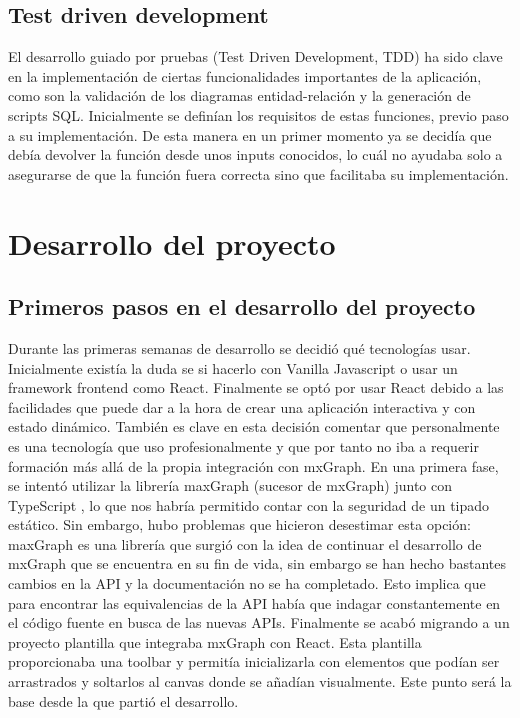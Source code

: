 \subsection{Test driven development}
El desarrollo guiado por pruebas (Test Driven Development, TDD) \cite{wiki:tdd} ha sido clave en la implementación de ciertas funcionalidades importantes de la aplicación, como son la validación de los diagramas entidad-relación y la generación de scripts SQL.
Inicialmente se definían los requisitos de estas funciones, previo paso a su implementación. De esta manera en un primer momento ya se decidía que debía devolver la función desde unos inputs conocidos, lo cuál no ayudaba solo a asegurarse de que la función fuera correcta sino que facilitaba su implementación.

\section{Desarrollo del proyecto}
\subsection{Primeros pasos en el desarrollo del proyecto}
Durante las primeras semanas de desarrollo se decidió qué tecnologías usar. Inicialmente existía la duda se si hacerlo con Vanilla Javascript o usar un framework frontend como React. Finalmente se optó por usar React debido a las facilidades que puede dar a la hora de crear una aplicación interactiva y con estado dinámico. También es clave en esta decisión comentar que personalmente es una tecnología que uso profesionalmente y que por tanto no iba a requerir formación más allá de la propia integración con mxGraph.
En una primera fase, se intentó utilizar la librería maxGraph (sucesor de mxGraph) junto con TypeScript 
\cite{typescript}, lo que nos habría permitido contar con la seguridad de un tipado estático. Sin embargo, hubo problemas que hicieron desestimar esta opción: maxGraph es una librería que surgió con la idea de continuar el desarrollo de mxGraph que se encuentra en su fin de vida, sin embargo se han hecho bastantes cambios en la API y la documentación no se ha completado. Esto implica que para encontrar las equivalencias de la API había que indagar constantemente en el código fuente en busca de las nuevas APIs.
Finalmente se acabó migrando a un proyecto plantilla que integraba mxGraph con React. Esta plantilla proporcionaba una toolbar y permitía inicializarla con elementos que podían ser arrastrados y soltarlos al canvas donde se añadían visualmente. Este punto será la base desde la que partió el desarrollo.

